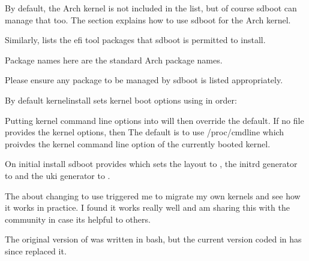 \documentclass[letterpaper,11pt,english]{sphinxmanual}
\begin{document}
\sphinxAtStartPar
By default, the Arch kernel is not included in the list, but of course sd\sphinxhyphen{}boot can manage that too.
The section {\hyperref[\detokenize{Arch-Kernels:arch-kernels}]{}} explains how to use sd\sphinxhyphen{}boot for the Arch kernel.

\sphinxAtStartPar
Similarly,  lists the efi tool packages that
sd\sphinxhyphen{}boot is permitted to install.

\sphinxAtStartPar
Package names here are the standard Arch package names.

\sphinxAtStartPar
Please ensure any package to be managed by sd\sphinxhyphen{}boot is listed appropriately.

\sphinxAtStartPar
By default kernel\sphinxhyphen{}install sets kernel boot options using in order:

\begin{sphinxVerbatim}[commandchars=\\\{\}]
\end{sphinxVerbatim}

\sphinxAtStartPar
Putting kernel command line options into  will then over\sphinxhyphen{}ride the
default. If no file provides the kernel options, then The default is to use /proc/cmdline
which proivdes the kernel command line option of the currently booted kernel.

\sphinxAtStartPar
On initial install sd\sphinxhyphen{}boot provides
 which sets the layout to , the initrd generator to 
and the uki generator to .

\sphinxAtStartPar
The 
about changing to use  triggered me to migrate my own kernels and
see how it works in practice. I found it works really well and am sharing this
with the community in case its helpful to others.

\sphinxAtStartPar
The original version of  was written in bash, but the current version
coded in  has since replaced it.
\end{document}
